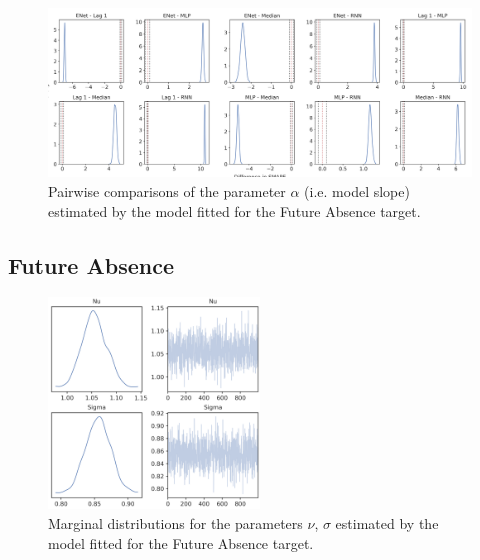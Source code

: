 \begin{figure}[H]
\centering
\includegraphics[width=\textwidth]{images/appendix_C/collapsed_comp_2.png}
\caption[\textbf{Targets collapsed pairwise comparisons of model fixed effect}]{Pairwise comparisons of the parameter $\alpha$ (i.e. model slope) estimated by the model fitted for the Future Absence target.}
\label{comp_coll_2}
\end{figure}

\subsection{Future Absence}
\label{future_abs_bayes_2}

\begin{figure}[H]
\centering
\includegraphics[width=0.5\textwidth]{images/appendix_C/Future Absence_marginals_2.png}
\caption[\textbf{Future absence marginal distributions}]{Marginal distributions for the parameters $\nu$, $\sigma$ estimated by the model fitted for the Future Absence target.}
\label{marginals_abs_2}
\end{figure}

